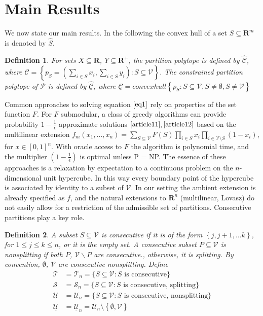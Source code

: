 \documentclass{article}
\newtheorem{definition}{Definition}
\theoremstyle{case}
\begin{document}
\vspace{4pt}

\section{Main Results}
We now state our main results. In the following the convex hull of a set $S \subseteq \mathbf{R}^m$ is denoted by $\hat{S}$.

\begin{definition}
For sets $X \subseteq \mathbf{R}$, $Y \subseteq \mathbf{R}^+$, the partition polytope is defined by $\hat{\mathcal{C}}$, where $\mathcal{C} = \left\lbrace p_S = (\sum_{i \in S} x_i, \sum_{i \in S}y_i) : S \subseteq \mathcal{V}\right\rbrace$. The constrained partition polytope of $\mathcal{P}$ is defined by $\hat{\underline{\mathcal{C}}}$, where $\underline{\mathcal{C}} = convexhull \left\lbrace p_S : S \subseteq \mathcal{V}, S \neq \emptyset , S \neq \mathcal{V}\right\rbrace$
\end{definition}

Common approaches to solving equation $\ref{eq1}$ rely on properties of the set function $F$. For $F$ submodular, a class of greedy algorithms can provide probability $1 - \frac{1}{\epsilon}$ approximate solutions $\cite{article11}, \cite{article12}$ based on the multilinear extension $f_m(x_1, \dots, x_n) = \sum_{S \subseteq \mathcal{V}} F(S)\prod_{i \in S}x_i \prod_{i \in \mathcal{V} \setminus S}(1 - x_i)$, for $x \in \left[ 0,1\right]^n$. With oracle access to $F$ the algorithm is polynomial time, and the multiplier $(1 - \frac{1}{\epsilon})$ is optimal unless P = NP. The essence of these approaches is a relaxation by expectation to a continuous problem on the $n$-dimensional unit hypercube. In this way every boundary point of the hypercube is associated by identity to a subset of $\mathcal{V}$. In our setting the ambient extension is already specified as $f$, and the natural extensions to $\mathbf{R}^n$ (multilinear, Lovasz) do not easily allow for a restriction of the admissible set of partitions. Consecutive partitions play a key role.

\begin{definition}
A subset $S \subseteq \mathcal{V}$ is consecutive if it is of the form $\left\lbrace j, j+1, \dots k\right\rbrace$, for $1 \leq j \leq k \leq n$, or it is the empty set. A consecutive subset $P \subseteq \mathcal{V}$ is nonsplitting if both $P$, $\mathcal{V}  \backslash P$ are consecutive., otherwise, it is splitting. By convention, $\emptyset$, $\mathcal{V}$ are consecutive nonsplitting. Define
\begin{align*}
\mathcal{T} &= \mathcal{T}_n = \{ S \subseteq \mathcal{V} : S \textrm{ is consecutive} \}\\
\mathcal{S} &= \mathcal{S}_n = \{ S \subseteq \mathcal{V} : S \textrm{ is consecutive, splitting} \} \\
\mathcal{U} &= \mathcal{U}_n = \{ S \subseteq \mathcal{V} : S \textrm{ is consecutive, nonsplitting}\} \\
\underline{\mathcal{U}} &= \underline{\mathcal{U}}_n = \mathcal{U}_n \setminus \left\lbrace \emptyset, \mathcal{V}\right\rbrace
\end{align*}
\end{definition}
\end{document}
